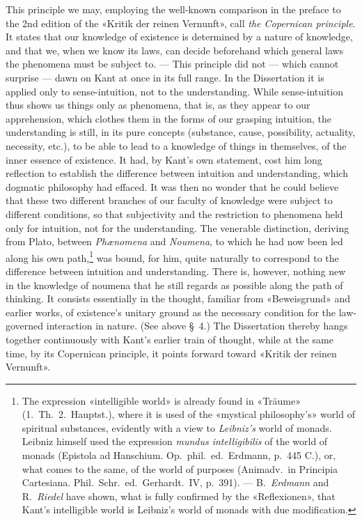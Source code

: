 \documentclass[12pt,a4paper]{article}
\newcommand{\opage}[1]{\marginnote{\footnotesize\textit{[#1]}}}
\begin{document}
This principle we may, employing the well-known comparison in the preface to
the 2nd edition of the «Kritik der reinen Vernunft», call \emph{the Copernican
principle}. It states that our knowledge of existence is determined by a
nature of knowledge, and that we, when we know its laws, can decide
beforehand which general laws the phenomena must be subject to. --- This
principle did not --- which cannot surprise --- dawn on Kant at once in its
full range. In the Dissertation it is applied only to sense-intuition, not
to the understanding. While sense-intuition thus shows us things only as
\opage{50}phenomena, that is, as they appear to our apprehension, which clothes them
in the forms of our grasping intuition, the understanding is still, in its
pure concepts (substance, cause, possibility, actuality, necessity, etc.),
to be able to lead to a knowledge of things in themselves, of the inner
essence of existence. It had, by Kant's own statement, cost him long
reflection to establish the difference between intuition and understanding,
which dogmatic philosophy had effaced. It was then no wonder that he could
believe that these two different branches of our faculty of knowledge were
subject to different conditions, so that subjectivity and the restriction to
phenomena held only for intuition, not for the understanding. The venerable
distinction, deriving from Plato, between \textit{Phænomena} and
\textit{Noumena}, to which he had now been led along his own
path,\footnote{The expression «intelligible world» is already found in
«Träume» (1.\ Th.\ 2.\ Hauptst.), where it is used of the «mystical
philosophy's» world of spiritual substances, evidently with a view to
\emph{Leibniz's} world of monads. Leibniz himself used the expression \textit{mundus
intelligibilis} of the world of monads (Epistola ad Hanschium. Op.\ phil.\
ed.\ Erdmann, p.\ 445 C.), or, what comes to the same, of the world of
purposes (Animadv.\ in Principia Cartesiana. Phil.\ Schr.\ ed.\ Gerhardt.\
IV, p.\ 391). --- B.\ \emph{Erdmann} and R.\ \emph{Riedel} have shown, what is fully
confirmed by the «Reflexionen», that Kant's intelligible world is Leibniz's
world of monads with due modification.} was bound, for him, quite naturally
to correspond to the difference between intuition and understanding. There
is, however, nothing new in the knowledge of noumena that he still regards
as possible along the path of thinking. It consists essentially in the
thought, familiar from «Beweisgrund» and earlier works, of existence's
unitary ground as the necessary condition for the law-governed interaction
in nature. (See above §\ 4.) The Dissertation thereby hangs together
continuously with Kant's earlier train of thought, while at the same time,
by its Copernican principle, it points forward toward «Kritik der reinen
Vernunft».
\end{document}
